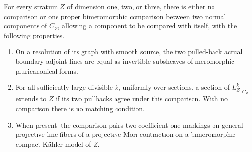 \begin{proposition}\label{prop:restriction-link}
For every stratum \(Z\) of dimension one, two, or three, there is either
no comparison or one proper bimeromorphic comparison between two normal
components of \(C_Z\), allowing a component to be compared with itself,
with the following properties.
\begin{enumerate}
 \item On a resolution of its graph with smooth source, the two pulled-back actual
 boundary adjoint lines are equal as invertible subsheaves of meromorphic
 pluricanonical forms.
 \item For all sufficiently large divisible \(k\), uniformly over
 sections, a section of \(L_Z^k|_{C_Z}\) extends to \(Z\) if its two
 pullbacks agree under this comparison.  With no comparison there is no
 matching condition.
 \item When present, the comparison pairs two coefficient-one markings
 on general projective-line fibers of a projective Mori contraction on
 a bimeromorphic compact K\"ahler model of \(Z\).
\end{enumerate}
\end{proposition}
